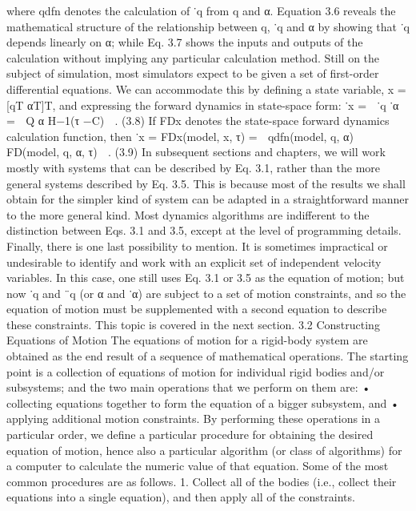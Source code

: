 where qdfn denotes the calculation of ˙q from q and α. Equation 3.6 reveals the mathematical structure of the relationship between q, ˙q and α by showing that ˙q depends linearly on α; while Eq. 3.7 shows the inputs and outputs of the calculation without implying any particular calculation method. Still on the subject of simulation, most simulators expect to be given a set of first-order differential equations. We can accommodate this by defining a state variable, x = [qT αT]T, and expressing the forward dynamics in state-space form: ˙x =  ˙q ˙α  =  Q α H−1(τ −C)  . (3.8) If FDx denotes the state-space forward dynamics calculation function, then ˙x = FDx(model, x, τ) =  qdfn(model, q, α) FD(model, q, α, τ)  . (3.9) In subsequent sections and chapters, we will work mostly with systems that can be described by Eq. 3.1, rather than the more general systems described by Eq. 3.5. This is because most of the results we shall obtain for the simpler kind of system can be adapted in a straightforward manner to the more general kind. Most dynamics algorithms are indifferent to the distinction between Eqs. 3.1 and 3.5, except at the level of programming details. Finally, there is one last possibility to mention. It is sometimes impractical or undesirable to identify and work with an explicit set of independent velocity variables. In this case, one still uses Eq. 3.1 or 3.5 as the equation of motion; but now ˙q and ¨q (or α and ˙α) are subject to a set of motion constraints, and so the equation of motion must be supplemented with a second equation to describe these constraints. This topic is covered in the next section. 3.2 Constructing Equations of Motion The equations of motion for a rigid-body system are obtained as the end result of a sequence of mathematical operations. The starting point is a collection of equations of motion for individual rigid bodies and/or subsystems; and the two main operations that we perform on them are: • collecting equations together to form the equation of a bigger subsystem, and • applying additional motion constraints. By performing these operations in a particular order, we define a particular procedure for obtaining the desired equation of motion, hence also a particular algorithm (or class of algorithms) for a computer to calculate the numeric value of that equation. Some of the most common procedures are as follows. 1. Collect all of the bodies (i.e., collect their equations into a single equation), and then apply all of the constraints.

